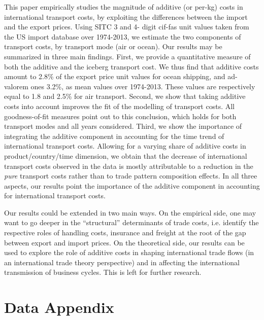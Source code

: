 \documentclass[a4paper,11pt]{article}
\begin{document}
This paper empirically studies the magnitude of additive (or per-kg) costs in international transport costs, by exploiting the differences between the import and the export prices. Using SITC 3 and 4- digit cif-fas unit values taken from the US import database over 1974-2013, we estimate the two components of transport costs, by transport mode (air or ocean).  Our results may be summarized in three main findings. First, we provide a quantitative measure of both the additive and the iceberg transport cost. We thus find that additive costs amount to 2.8\% of the export price unit values for ocean shipping, and ad-valorem ones 3.2\%, as mean values over 1974-2013. These values are respectively equal to 1.8 and 2.5\% for air transport. Second, we show that taking additive costs into account improves the fit of the modelling of transport costs. All goodness-of-fit measures point out to this conclusion, which holds for both transport modes and all years considered. Third, we show the importance of integrating the additive component in accounting for the time trend of international transport costs. Allowing for a varying share of additive costs in product/country/time dimension, we obtain that the decrease of international transport costs observed in the data is mostly attributable to a reduction in the \textit{pure} transport costs rather than to trade pattern composition effects. In all three aspects, our results point the importance of the additive component in accounting for international transport costs.

Our results could be extended in two main ways. On the empirical side, one may want to go deeper in the ``structural'' determinants of trade costs, i.e. identify the respective roles of handling costs, insurance and freight at the root of the gap between export and import prices. On the theoretical side, our results can be used to explore the role of additive costs in shaping international trade flows (in an international trade theory perspective) and in affecting the international transmission of business cycles. This is left for further research.



\newpage




\newpage


\appendix

\section{Data Appendix \label{app:data}}
\end{document}
